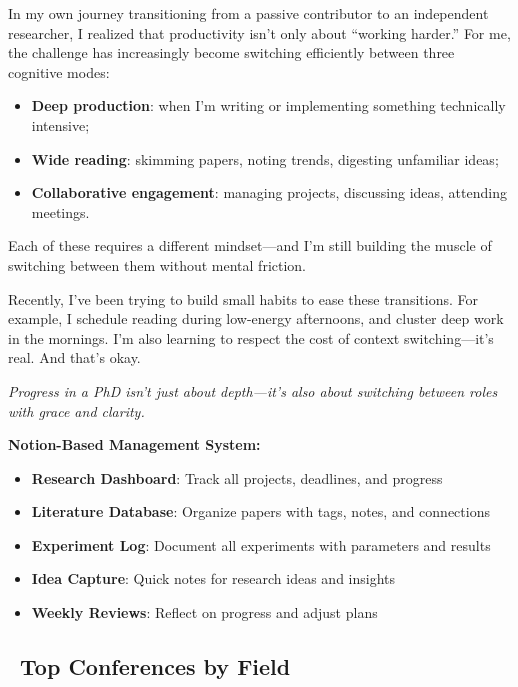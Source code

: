 \documentclass[11pt,a4paper]{article}
\begin{document}
\begin{tcolorbox}[colback=purple!5,colframe=royalpurple,title=\faBrain~Personal Reflection — Navigating Mode Switching in Research Life]
In my own journey transitioning from a passive contributor to an independent researcher, I realized that productivity isn't only about ``working harder.'' For me, the challenge has increasingly become switching efficiently between three cognitive modes:

\begin{itemize}
    \item \textbf{Deep production}: when I'm writing or implementing something technically intensive;
    \item \textbf{Wide reading}: skimming papers, noting trends, digesting unfamiliar ideas;
    \item \textbf{Collaborative engagement}: managing projects, discussing ideas, attending meetings.
\end{itemize}

Each of these requires a different mindset—and I'm still building the muscle of switching between them without mental friction.

Recently, I've been trying to build small habits to ease these transitions. For example, I schedule reading during low-energy afternoons, and cluster deep work in the mornings. I'm also learning to respect the cost of context switching—it's real. And that's okay.

\textit{Progress in a PhD isn't just about depth—it's also about switching between roles with grace and clarity.}
\end{tcolorbox}

\textbf{Notion-Based Management System:}
\begin{itemize}
    \item \textbf{Research Dashboard}: Track all projects, deadlines, and progress
    \item \textbf{Literature Database}: Organize papers with tags, notes, and connections
    \item \textbf{Experiment Log}: Document all experiments with parameters and results
    \item \textbf{Idea Capture}: Quick notes for research ideas and insights
    \item \textbf{Weekly Reviews}: Reflect on progress and adjust plans
\end{itemize}

\subsection{\faTrophy~Top Conferences by Field}
\end{document}
